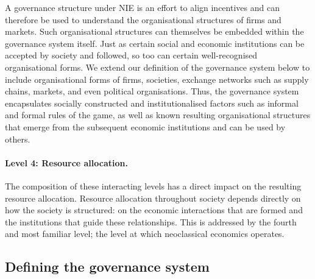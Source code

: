 A governance structure under NIE is an effort to align incentives and can therefore be used to understand the organisational structures of firms and markets. Such organisational structures can themselves be embedded within the governance system itself. Just as certain social and economic institutions can be accepted by society and followed, so too can certain well-recognised organisational forms. We extend our definition of the governance system below to include organisational forms of firms, societies, exchange networks such as supply chains, markets, and even political organisations. Thus, the governance system encapsulates socially constructed and institutionalised factors such as informal and formal rules of the game, as well as known resulting organisational structures that emerge from the subsequent economic institutions and can be used by others.

\paragraph{Level 4: Resource allocation.}

The composition of these interacting levels has a direct impact on the resulting resource allocation. Resource allocation throughout society depends directly on how the society is structured: on the economic interactions that are formed and the institutions that guide these relationships. This is addressed by the fourth and most familiar level; the level at which neoclassical economics operates.

\subsection{Defining the governance system}

